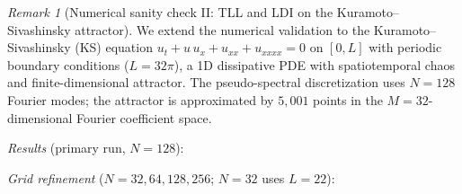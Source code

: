 \documentclass[12pt,a4paper]{article}
\theoremstyle{definition}
\theoremstyle{plain}
\theoremstyle{remark}
\newtheorem{remark}[definition]{Remark}
\begin{document}
\begin{remark}[Numerical sanity check II: TLL and LDI on the Kuramoto--Sivashinsky attractor]
\label{rem:tll-ldi-ks}
We extend the numerical validation to the Kuramoto--Sivashinsky (KS) equation
$u_t + u\,u_x + u_{xx} + u_{xxxx} = 0$ on $[0, L]$ with periodic boundary
conditions ($L = 32\pi$), a 1D dissipative PDE with spatiotemporal chaos and
finite-dimensional attractor.  The pseudo-spectral discretization uses $N = 128$
Fourier modes; the attractor is approximated by $5{,}001$ points in the
$M = 32$-dimensional Fourier coefficient space.

\emph{Results} (primary run, $N = 128$):

\begin{center}
\small
{}
\end{center}

\emph{Grid refinement} ($N = 32, 64, 128, 256$; $N=32$ uses $L = 22$):

\begin{center}
\small
{}
\end{center}


\end{remark}
\end{document}
